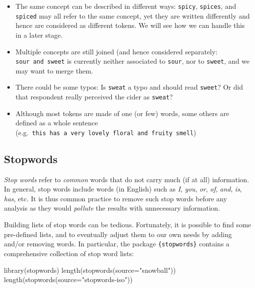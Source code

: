 \documentclass[
]{book}
\newenvironment{Shaded}{\begin{snugshade}}{\end{snugshade}}
\newcommand{\AttributeTok}[1]{\textcolor[rgb]{0.77,0.63,0.00}{#1}}
\newcommand{\FunctionTok}[1]{\textcolor[rgb]{0.00,0.00,0.00}{#1}}
\newcommand{\NormalTok}[1]{#1}
\newcommand{\StringTok}[1]{\textcolor[rgb]{0.31,0.60,0.02}{#1}}
\providecommand{\tightlist}{%
  \setlength{\itemsep}{0pt}\setlength{\parskip}{0pt}}
\begin{document}
\begin{itemize}
\tightlist
\item
  The same concept can be described in different ways: \texttt{spicy}, \texttt{spices}, and \texttt{spiced} may all refer to the same concept, yet they are written differently and hence are considered as different tokens. We will see how we can handle this in a later stage.
\item
  Multiple concepts are still joined (and hence considered separately: \texttt{sour\ and\ sweet} is currently neither associated to \texttt{sour}, nor to \texttt{sweet}, and we may want to merge them.
\item
  There could be some typos: Is \texttt{sweat} a typo and should read \texttt{sweet}? Or did that respondent really perceived the cider as \texttt{sweat}?
\item
  Although most tokens are made of one (or few) words, some others are defined as a whole sentence (e.g.~\texttt{this\ has\ a\ very\ lovely\ floral\ and\ fruity\ smell})
\end{itemize}

\hypertarget{stopwords}{%
\subsection{Stopwords}\label{stopwords}}

\emph{Stop words} refer to \emph{common} words that do not carry much (if at all) information. In general, stop words include words (in English) such as \emph{I}, \emph{you}, \emph{or}, \emph{of}, \emph{and}, \emph{is}, \emph{has}, etc. It is thus common practice to remove such stop words before any analysis as they would \emph{pollute} the results with unnecessary information.

Building lists of stop words can be tedious. Fortunately, it is possible to find some pre-defined lists, and to eventually adjust them to our own needs by adding and/or removing words. In particular, the package \texttt{\{stopwords\}} contains a comprehensive collection of stop word lists:

\begin{Shaded}
\begin{Highlighting}[]
\FunctionTok{library}\NormalTok{(stopwords)}
\FunctionTok{length}\NormalTok{(}\FunctionTok{stopwords}\NormalTok{(}\AttributeTok{source=}\StringTok{"snowball"}\NormalTok{))}
\FunctionTok{length}\NormalTok{(}\FunctionTok{stopwords}\NormalTok{(}\AttributeTok{source=}\StringTok{"stopwords{-}iso"}\NormalTok{))}
\end{Highlighting}
\end{Shaded}
\end{document}
